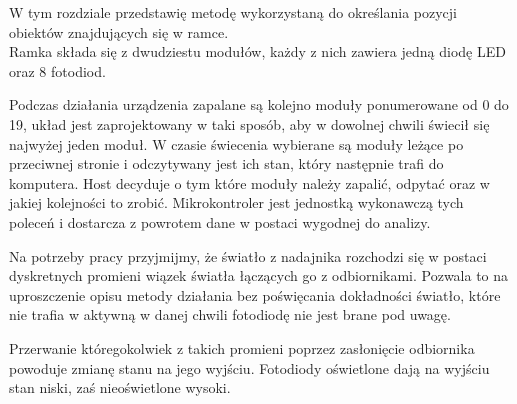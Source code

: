 \label{ch:method}

W tym rozdziale przedstawię metodę wykorzystaną do określania pozycji obiektów znajdujących się w ramce.\\

Ramka składa się z dwudziestu modułów, każdy z nich zawiera jedną diodę LED oraz 8 fotodiod.

Podczas działania urządzenia zapalane są kolejno moduły ponumerowane od 0 do 19, układ jest zaprojektowany w taki sposób, aby w dowolnej chwili świecił się najwyżej jeden moduł. W czasie świecenia wybierane są moduły leżące po przeciwnej stronie i odczytywany jest ich stan, który następnie trafi do komputera. Host decyduje o tym które moduły należy zapalić, odpytać oraz w jakiej kolejności to zrobić. Mikrokontroler jest jednostką wykonawczą tych poleceń i dostarcza z powrotem dane w postaci wygodnej do analizy.

Na potrzeby pracy przyjmijmy, że światło z nadajnika rozchodzi się w postaci dyskretnych promieni \pauza wiązek światła łączących go z odbiornikami. Pozwala to na uproszczenie opisu metody działania bez poświęcania dokładności \pauza światło, które nie trafia w aktywną w danej chwili fotodiodę nie jest brane pod uwagę.

Przerwanie któregokolwiek z takich promieni poprzez zasłonięcie odbiornika powoduje zmianę stanu na jego wyjściu. Fotodiody oświetlone dają na wyjściu stan niski, zaś nieoświetlone \ppauza wysoki.

